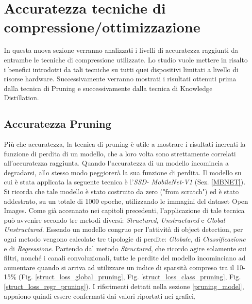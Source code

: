 \section{Accuratezza tecniche di compressione/ottimizzazione}
In questa nuova sezione verranno analizzati i livelli di accuratezza raggiunti 
da entrambe le tecniche di compressione utilizzate. Lo studio vuole mettere 
in risalto i benefici introdotti da tali tecniche su tutti quei dispositivi limitati 
a livello di risorse hardware. Successivamente verranno mostrati i risultati 
ottenuti prima dalla tecnica di Pruning e successivamente dalla tecnica di 
Knowledge Distillation.

\subsection{Accuratezza Pruning}
Più che accuratezza, la tecnica di pruning è utile a mostrare i risultati inerenti 
la funzione di perdita di un modello, che a loro volta sono strettamente 
correlati all'accuratezza raggiunta. Quando l'accuratezza di un modello 
incomincia a degradarsi, allo stesso modo peggiorerà la sua funzione di 
perdita. Il modello su cui è stata applicata la seguente tecnica è l'\emph{SSD-
MobileNet-V1} (Sez. \ref{MBNET}). Si ricorda che tale modello è stato costruito da 
zero ("from scratch") ed è stato addestrato, su un totale di 1000 epoche, 
utilizzando le immagini del dataset Open Images. Come già accennato nei 
capitoli precedenti, l'applicazione di tale tecnica può avvenire secondo tre
metodi diversi: \emph{Structured}, \emph{Unstructured} e \emph{Global Unstructured}. Essendo un 
modello congruo per l'attività di object detection, per ogni metodo vengono 
calcolate tre tipologie di perdite: \emph{Globale}, di \emph{Classificazione} e di \emph{Regressione}.
Partendo dal metodo \emph{Structured}, che ricordo agire solamente sui filtri, 
nonché i canali convoluzionali, tutte le perdite del modello incominciano 
ad aumentare quando si arriva ad utilizzare un indice di sparsità compreso 
tra il 10-15\% (Fig. \ref{struct_loss_global_pruning}, Fig. \ref{struct_loss_class_pruning}, Fig.\ref{struct_loss_regr_pruning}). I riferimenti dettati nella sezione 
\ref{pruning_model}, appaiono quindi essere confermati dai valori riportati nei grafici, 
